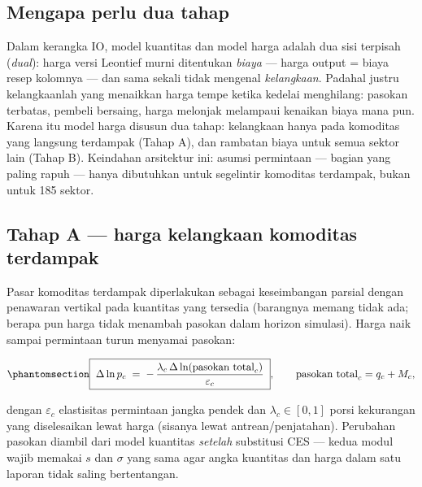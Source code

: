 \documentclass[
  manuscript=article,
  layout=publish,
  year=2026,
  volume=1,
]{den}
\begin{document}
\subsection{Mengapa perlu dua tahap}\label{mengapa-perlu-dua-tahap}

Dalam kerangka IO, model kuantitas dan model harga adalah dua sisi
terpisah (\emph{dual}): harga versi Leontief murni ditentukan
\emph{biaya} --- harga output = biaya resep kolomnya --- dan sama sekali
tidak mengenal \emph{kelangkaan}. Padahal justru kelangkaanlah yang
menaikkan harga tempe ketika kedelai menghilang: pasokan terbatas,
pembeli bersaing, harga melonjak melampaui kenaikan biaya mana pun.
Karena itu model harga disusun dua tahap: kelangkaan hanya pada
komoditas yang langsung terdampak (Tahap A), dan rambatan biaya untuk
semua sektor lain (Tahap B). Keindahan arsitektur ini: asumsi permintaan
--- bagian yang paling rapuh --- hanya dibutuhkan untuk segelintir
komoditas terdampak, bukan untuk 185 sektor.

\subsection{Tahap A --- harga kelangkaan komoditas
terdampak}\label{tahap-a-harga-kelangkaan-komoditas-terdampak}

Pasar komoditas terdampak diperlakukan sebagai keseimbangan parsial
dengan penawaran vertikal pada kuantitas yang tersedia (barangnya memang
tidak ada; berapa pun harga tidak menambah pasokan dalam horizon
simulasi). Harga naik sampai permintaan turun menyamai pasokan:

\begin{equation}\phantomsection\label{eq-scarcity}{
\boxed{\;
\Delta \ln p_c \;=\; -\,\frac{\lambda_c \,\Delta \ln (\text{pasokan total}_c)}{\varepsilon_c}
\;}, \qquad
\text{pasokan total}_c = q_c + M_c,
}\end{equation}

dengan \(\varepsilon_c\) elastisitas permintaan jangka pendek dan
\(\lambda_c \in
[0,1]\) porsi kekurangan yang diselesaikan lewat harga (sisanya lewat
antrean/penjatahan). Perubahan pasokan diambil dari model kuantitas
\emph{setelah} substitusi CES --- kedua modul wajib memakai \(s\) dan
\(\sigma\) yang sama agar angka kuantitas dan harga dalam satu laporan
tidak saling bertentangan.
\end{document}
